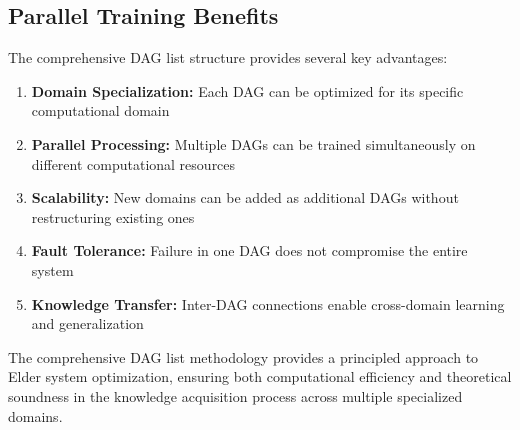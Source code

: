 \subsection{Parallel Training Benefits}

The comprehensive DAG list structure provides several key advantages:

\begin{enumerate}
    \item \textbf{Domain Specialization:} Each DAG can be optimized for its specific computational domain
    \item \textbf{Parallel Processing:} Multiple DAGs can be trained simultaneously on different computational resources
    \item \textbf{Scalability:} New domains can be added as additional DAGs without restructuring existing ones
    \item \textbf{Fault Tolerance:} Failure in one DAG does not compromise the entire system
    \item \textbf{Knowledge Transfer:} Inter-DAG connections enable cross-domain learning and generalization
\end{enumerate}

The comprehensive DAG list methodology provides a principled approach to Elder system optimization, ensuring both computational efficiency and theoretical soundness in the knowledge acquisition process across multiple specialized domains.